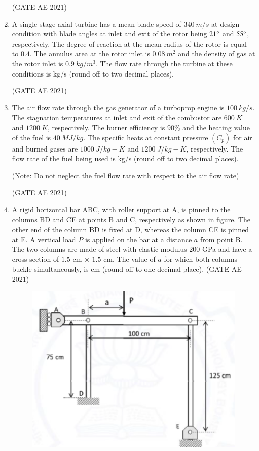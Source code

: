 \documentclass[journal,12pt,onecolumn]{IEEEtran}
\theoremstyle{remark}
\begin{document}
\begin{flushleft}
\begin{enumerate}
\hfill (GATE AE 2021)

\item 
A single stage axial turbine has a mean blade speed of $340~m/s$ at design condition with blade angles at inlet and exit of the rotor being $21\degree$ and $55\degree$, respectively. The degree of reaction at the mean radius of the rotor is equal to $0.4$. The annulus area at the rotor inlet is $0.08~m^{2}$ and the density of gas at the rotor inlet is $0.9~kg/m^{3}$. The flow rate through the turbine at these conditions is \underline{\hspace{2cm}} kg/s (round off to two decimal places).  

\hfill (GATE AE 2021)

\item 
The air flow rate through the gas generator of a turboprop engine is $100~kg/s$. The stagnation temperatures at inlet and exit of the combustor are $600~K$ and $1200~K$, respectively. The burner efficiency is $90\%$ and the heating value of the fuel is $40~MJ/kg$. The specific heats at constant pressure $(C_p)$ for air and burned gases are $1000~J/kg-K$ and $1200~J/kg-K$, respectively. The flow rate of the fuel being used is \underline{\hspace{2cm}} kg/s (round off to two decimal places).  

(Note: Do not neglect the fuel flow rate with respect to the air flow rate)  

\hfill (GATE AE 2021)

\item 
A rigid horizontal bar ABC, with roller support at A, is pinned to the columns BD and CE at points B and C, respectively as shown in figure. The other end of the column BD is fixed at D, whereas the column CE is pinned at E. A vertical load $P$ is applied on the bar at a distance $a$ from point B. The two columns are made of steel with elastic modulus $200$ GPa and have a cross section of $1.5$ cm $\times$ $1.5$ cm. The value of $a$ for which both columns buckle simultaneously, is \underline{\hfill} cm (round off to one decimal place).
\hfill (GATE AE 2021)

\begin{figure}[H]
    \centering
    \includegraphics[width=0.5\columnwidth]{figs/49.png}
    \caption{}
    \label{fig:placeholder}
\end{figure}


\end{enumerate}
\end{flushleft}
\end{document}

